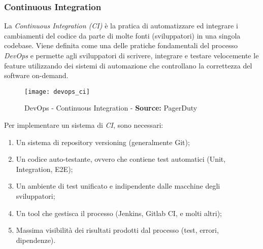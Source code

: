 \documentclass[../main.tex]{subfiles}
\begin{document}
        		\subsubsection{Continuous Integration}
        		
        			La \emph{Continuous Integration (CI)}\cite{devops_ci} è la pratica di automatizzare ed integrare i cambiamenti del codice da parte di molte fonti (sviluppatori) in una singola codebase. Viene definita come una delle pratiche fondamentali del processo \emph{DevOps} e permette agli sviluppatori di scrivere, integrare e testare velocemente le feature utilizzando dei sistemi di automazione che controllano la correttezza del software on-demand.
        			
        			\begin{figure}[h]
        				\centering
        				\texttt{[image: devops\_ci]}
        				\caption{DevOps - Continuous Integration - \textbf{Source:} PagerDuty}
        				\label{fig:devops_ci}
        			\end{figure}
        			
        			Per implementare un sistema di \emph{CI}, sono necessari:
        			\begin{enumerate}
        				\item Un sistema di repository versioning (generalmente Git);
        				\item Un codice auto-testante, ovvero che contiene test automatici (Unit, Integration, E2E);
        				\item Un ambiente di test unificato e indipendente dalle macchine degli sviluppatori;
        				\item Un tool che gestisca il processo (Jenkins, Gitlab CI, e molti altri);
        				\item Massima visibilità dei risultati prodotti dal processo (test, errori, dipendenze).
        			\end{enumerate}
        			
\end{document}
